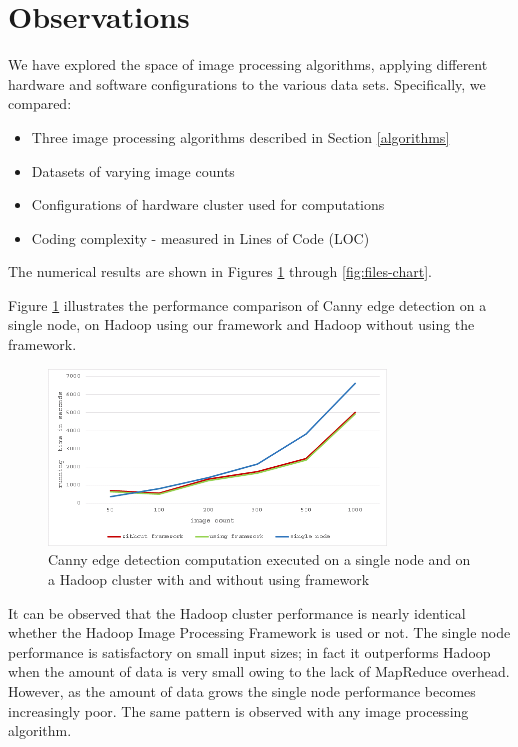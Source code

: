 \documentclass{osuthesis}
\begin{document}
				\section{Observations}   
				
				We have explored the space of image processing algorithms, applying
				different hardware and software configurations to the various data
				sets.  Specifically, we compared:
				
				\begin{itemize}
					\item Three image processing algorithms described in Section
					\ref{algorithms}
					\item Datasets of varying image counts
					\item Configurations of hardware cluster used for computations 
					\item Coding complexity - measured in Lines of Code (LOC)
				\end{itemize}
				
				The numerical results are shown in Figures \ref{fig:perf-chart}
				through \ref{fig:files-chart}.
				
				Figure \ref{fig:perf-chart} illustrates the performance comparison of
				Canny edge detection on a single node, on Hadoop using our framework
				and Hadoop without using the framework.
				
				\begin{figure}[h]
					\centering
					\includegraphics[width=0.80\textwidth]{perf-graph}
					\caption{Canny edge detection computation executed on a single node
						and on a Hadoop cluster with and without using framework}
					\label{fig:perf-chart}
				\end{figure}
				
				It can be observed that the Hadoop cluster performance is nearly
				identical whether the Hadoop Image Processing Framework is used or
				not.  The single node performance is satisfactory on small input
				sizes; in fact it outperforms Hadoop when the amount of data is very
				small owing to the lack of MapReduce overhead.  However, as the amount
				of data grows the single node performance becomes increasingly poor.
				The same pattern is observed with any image processing algorithm.
				
\end{document}
